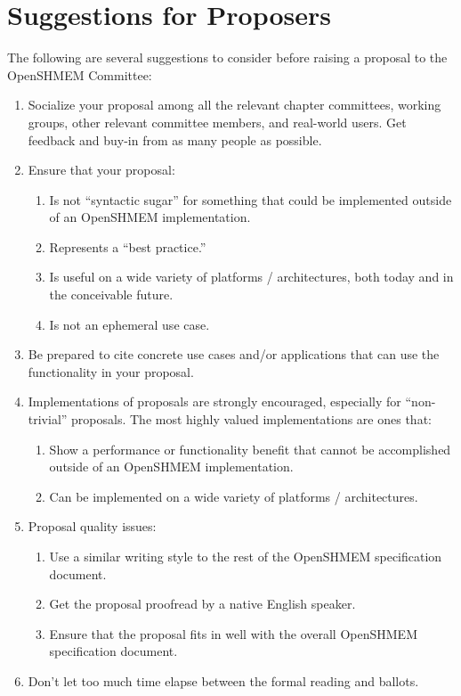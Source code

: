 \chapter{Suggestions for Proposers}

The following are several suggestions to consider before raising a
proposal to the OpenSHMEM Committee:

\begin{enumerate}
\item Socialize your proposal among all the relevant chapter
  committees, working groups, other relevant committee members, and real-world users.  Get
  feedback and buy-in from as many people as possible.

\item Ensure that your proposal:
  \begin{enumerate}
  \item Is not ``syntactic sugar'' for something that could be
    implemented outside of an OpenSHMEM implementation.
  \item Represents a ``best practice.''
  \item Is useful on a wide variety of platforms / architectures, both
    today and in the conceivable future.
  \item Is not an ephemeral use case.
  \end{enumerate}

\item Be prepared to cite concrete use cases and/or applications that
  can use the functionality in your proposal.

\item Implementations of proposals are strongly encouraged, especially
  for ``non-trivial'' proposals.  The most highly valued
  implementations are ones that:
  \begin{enumerate}
  \item Show a performance or functionality benefit that cannot be
    accomplished outside of an OpenSHMEM implementation.
  \item Can be implemented on a wide variety of platforms /
    architectures.
  \end{enumerate}

\item Proposal quality issues:
  \begin{enumerate}
  \item Use a similar writing style to the rest of the OpenSHMEM
    specification document.
  \item Get the proposal proofread by a native English speaker.
  \item Ensure that the proposal fits in well with the overall OpenSHMEM
    specification document.
  \end{enumerate}

\item Don't let too much time elapse between the formal reading and
  ballots.

\end{enumerate}
